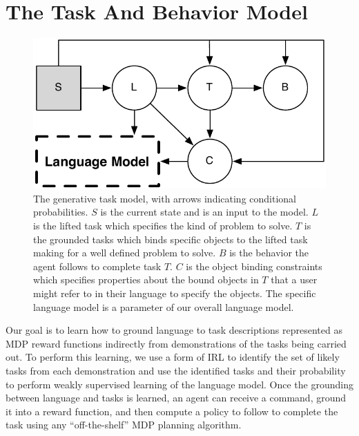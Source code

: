 \documentclass[conference]{IEEEtran}
\begin{document}
\section{The Task And Behavior Model}
\begin{figure}[tbp]
\begin{center}
\includegraphics[width=.7\columnwidth]{images/taskModel}
\caption{The generative task model, with arrows indicating conditional probabilities. $S$ is the current state and is an input to the model. $L$ is the lifted task which specifies the kind of problem to solve. $T$ is the grounded tasks which binds specific objects to the lifted task making for a well defined problem to solve. $B$ is the behavior the agent follows to complete task $T$. $C$ is the object binding constraints which specifies properties about the bound objects in $T$ that a user might refer to in their language to specify the objects. The specific language model is a parameter of our overall language model.}
\label{fig:tm}
\end{center}
\end{figure}
Our goal is to learn how to ground language to task descriptions represented as MDP reward functions indirectly from demonstrations of the tasks being carried out. To perform this learning, we use a form of IRL to identify the set of likely tasks from each demonstration and use the identified tasks and their probability to perform weakly supervised learning of the language model. Once the grounding between language and tasks is learned, an agent can receive a command, ground it into a reward function, and then compute a policy to follow to complete the task using any ``off-the-shelf'' MDP planning algorithm.
\end{document}

